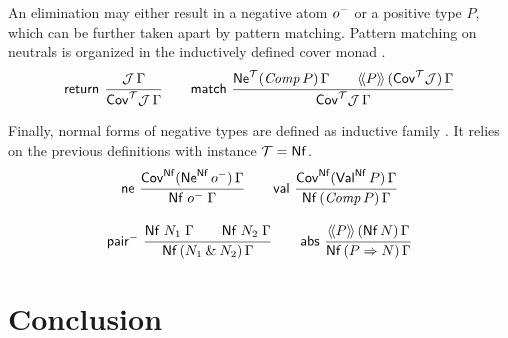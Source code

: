 \documentclass[a4paper,USenglish,cleveref, autoref]{lipics-v2019}
\begin{document}
An elimination may either result in a negative atom $o^-$ or a
positive type $P$, which can be further taken apart by pattern
matching.  Pattern matching on neutrals is organized in the
inductively defined cover monad \fbox{$\Cov[\T]$}.
\begin{gather*}
  \nru{\treturn}{\J\,\Gamma}{\CoverT \J \Gamma}
\qquad
  \nru{\tmatch}
      {\NeTP {\Comp P} \Gamma \qquad \AddHypP P {\Cov[\T]\J} \Gamma}
      {\CoverT \J \Gamma}
\end{gather*}

Finally, normal forms of negative types are defined as inductive
family .  It relies on the previous definitions
with instance $\mathcal{T} = \mathsf{Nf}$.
\begin{gather*}
  \nru{\tne}
      {\Cov[\tNf](\tNe[\tNf]\,\natom)\,\Gamma}
      {\Nf {\natom} \Gamma}
\qquad
  \nru{\tval}
      {\Cov[\tNf](\tVal[\tNf]\,P)\,\Gamma}
      {\NfP {\Comp P} \Gamma}
\\[2ex]
  \nru{\npair}
      {\Nf {N_1} \Gamma \qquad \Nf {N_2} \Gamma}
      {\NfP {N_1 \ntimes N_2} \Gamma}
\qquad
  \nru{\tabs}
      {\AddHypP P {\tNf\, N} \Gamma}
      {\NfP {P \To N} \Gamma}
\end{gather*}


\section{Conclusion}
\label{sec:concl}



\end{document}
